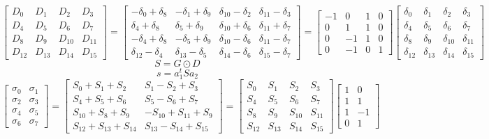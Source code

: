 \documentclass{article}%
\begin{document}
\[%
\left[\begin{matrix}D_{0} & D_{1} & D_{2} & D_{3}\\D_{4} & D_{5} & D_{6} & D_{7}\\D_{8} & D_{9} & D_{10} & D_{11}\\D_{12} & D_{13} & D_{14} & D_{15}\end{matrix}\right] = \left[\begin{matrix}- \delta_{0} + \delta_{8} & - \delta_{1} + \delta_{9} & \delta_{10} - \delta_{2} & \delta_{11} - \delta_{3}\\\delta_{4} + \delta_{8} & \delta_{5} + \delta_{9} & \delta_{10} + \delta_{6} & \delta_{11} + \delta_{7}\\- \delta_{4} + \delta_{8} & - \delta_{5} + \delta_{9} & \delta_{10} - \delta_{6} & \delta_{11} - \delta_{7}\\\delta_{12} - \delta_{4} & \delta_{13} - \delta_{5} & \delta_{14} - \delta_{6} & \delta_{15} - \delta_{7}\end{matrix}\right] = \left[\begin{matrix}-1 & 0 & 1 & 0\\0 & 1 & 1 & 0\\0 & -1 & 1 & 0\\0 & -1 & 0 & 1\end{matrix}\right] \left[\begin{matrix}\delta_{0} & \delta_{1} & \delta_{2} & \delta_{3}\\\delta_{4} & \delta_{5} & \delta_{6} & \delta_{7}\\\delta_{8} & \delta_{9} & \delta_{10} & \delta_{11}\\\delta_{12} & \delta_{13} & \delta_{14} & \delta_{15}\end{matrix}\right]%
\]%
\[%
S = G \odot D%
\]%
\[%
s = a_1^t S a_2%
\]%
\[%
\left[\begin{matrix}\sigma_{0} & \sigma_{1}\\\sigma_{2} & \sigma_{3}\\\sigma_{4} & \sigma_{5}\\\sigma_{6} & \sigma_{7}\end{matrix}\right] = \left[\begin{matrix}S_{0} + S_{1} + S_{2} & S_{1} - S_{2} + S_{3}\\S_{4} + S_{5} + S_{6} & S_{5} - S_{6} + S_{7}\\S_{10} + S_{8} + S_{9} & - S_{10} + S_{11} + S_{9}\\S_{12} + S_{13} + S_{14} & S_{13} - S_{14} + S_{15}\end{matrix}\right] = \left[\begin{matrix}S_{0} & S_{1} & S_{2} & S_{3}\\S_{4} & S_{5} & S_{6} & S_{7}\\S_{8} & S_{9} & S_{10} & S_{11}\\S_{12} & S_{13} & S_{14} & S_{15}\end{matrix}\right] \left[\begin{matrix}1 & 0\\1 & 1\\1 & -1\\0 & 1\end{matrix}\right]%
\]%
\end{document}
